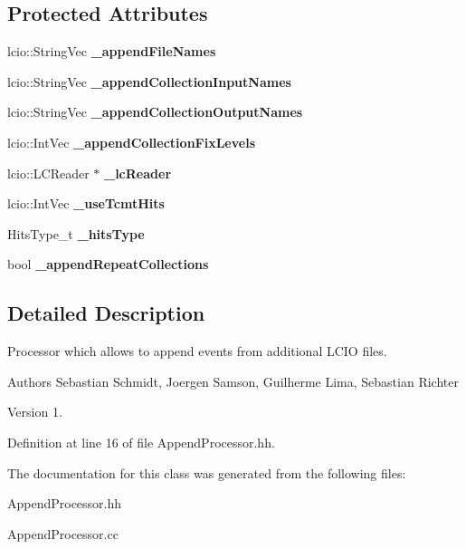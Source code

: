 \subsection*{Protected Attributes}
\begin{DoxyCompactItemize}
\item 
lcio\-::\-String\-Vec {\bfseries \-\_\-append\-File\-Names}\label{classCALICE_1_1AppendProcessor_afdd4ad0e4dada93d7d01c3f7632ab52f}

\item 
lcio\-::\-String\-Vec {\bfseries \-\_\-append\-Collection\-Input\-Names}\label{classCALICE_1_1AppendProcessor_adaa30643ff06a2922ba6150d0074a209}

\item 
lcio\-::\-String\-Vec {\bfseries \-\_\-append\-Collection\-Output\-Names}\label{classCALICE_1_1AppendProcessor_a587c513c73ccba16381895637ea7a573}

\item 
lcio\-::\-Int\-Vec {\bfseries \-\_\-append\-Collection\-Fix\-Levels}\label{classCALICE_1_1AppendProcessor_aeffce05dc4e7e46b4b6f8255bc25b087}

\item 
lcio\-::\-L\-C\-Reader $\ast$ {\bfseries \-\_\-lc\-Reader}\label{classCALICE_1_1AppendProcessor_af05bb76ed964d8ea1834a757bd6ea9f6}

\item 
lcio\-::\-Int\-Vec {\bfseries \-\_\-use\-Tcmt\-Hits}\label{classCALICE_1_1AppendProcessor_a7970df457e270143908dd9a3b79b39b1}

\item 
Hits\-Type\-\_\-t {\bfseries \-\_\-hits\-Type}\label{classCALICE_1_1AppendProcessor_ad93eefa5222ef45a3715c19eaa8ce2de}

\item 
bool {\bfseries \-\_\-append\-Repeat\-Collections}\label{classCALICE_1_1AppendProcessor_a82e205bebcae4791e97857b1b548ff28}

\end{DoxyCompactItemize}


\subsection{Detailed Description}
Processor which allows to append events from additional L\-C\-I\-O files. 

\begin{DoxyAuthor}{Authors}
Sebastian Schmidt, Joergen Samson, Guilherme Lima, Sebastian Richter 
\end{DoxyAuthor}
\begin{DoxyVersion}{Version}
1. 
\end{DoxyVersion}


Definition at line 16 of file Append\-Processor.\-hh.



The documentation for this class was generated from the following files\-:\begin{DoxyCompactItemize}
\item 
Append\-Processor.\-hh\item 
Append\-Processor.\-cc\end{DoxyCompactItemize}

